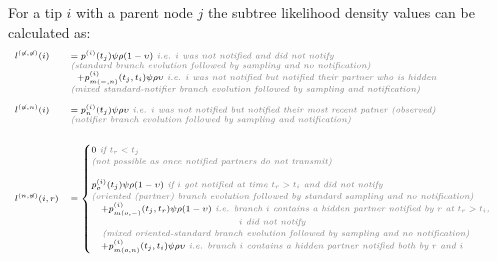 \documentclass[a4paper,10pt]{article}
\begin{document}
For a tip $i$ with a parent node $j$ the subtree likelihood density values can be calculated as:
\begin{equation}
\scriptsize
\begin{array}{ll}
l^{(\not{n},\not{n})}(i) &= p^{(i)}(t_j)\psi\rho (1-\upsilon) \textit{\color{gray} ~i.e. $i$ was not notified and did not notify}\\
& \textit{\color{gray} (standard branch evolution followed by sampling and no notification)}\\
&~~+p_{m(-,n)}^{(i)}(t_j,t_i)\psi\rho\upsilon \textit{\color{gray} ~i.e. $i$ was not notified but notified their partner who is hidden}\\
& \textit{\color{gray} (mixed standard-notifier branch evolution followed by sampling and notification)}\\
\\
l^{(\not{n},n)}(i) &= p_n^{(i)}(t_j)\psi\rho
\upsilon \textit{\color{gray} ~i.e. $i$ was not notified but notified their most recent patner (observed)}\\
& \textit{\color{gray} (notifier branch evolution followed by sampling and notification)}\\
&~~\\
\\
l^{(n,\not{n})}(i,r) &= \begin{cases}
0 \textit{\color{gray} ~if $t_r < t_j$}\\
\textit{\color{gray} (not possible as once notified partners do not transmit)}
\\
\\
p_o^{(i)}(t_j)\psi\rho(1 - \upsilon) \textit{\color{gray} ~if $i$ got notified at time $t_r > t_i$ and did not notify}\\
\textit{\color{gray} (oriented (partner) branch evolution followed by standard sampling and no notification)}
\\
~~~+p_{m(o,-)}^{(i)}(t_j,t_r)\psi\rho(1-\upsilon) \textit{\color{gray} ~i.e. branch $i$ contains a hidden partner notified by $r$ at $t_r > t_i$, }\\
\textit{\color{gray} ~~~~~~~~~~~~~~~~~~~~~~~~~~~~~~~~~~~~~~~~~$i$  did not notify}\\
 \textit{\color{gray} ~~~(mixed oriented-standard branch evolution followed by sampling and no notification)}\\
 ~~~+p_{m(o,n)}^{(i)}(t_j,t_i)\psi\rho\upsilon \textit{\color{gray} ~i.e. branch $i$ contains a hidden partner notified both by $r$ and $i$}\\

\end{cases}
\end{array}
\end{equation}
\end{document}

